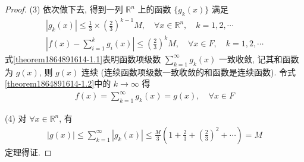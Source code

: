 \documentclass[../../main.tex]{subfiles}
\begin{document}
\begin{proof}
(3) 依次做下去, 得到一列 $\mathbb{R}^n$ 上的函数 $\{g_k(x)\}$ 满足
\begin{gather}
|g_k(x)| \leqslant \frac{1}{3} \times \left(\frac{2}{3}\right)^{k - 1} M, \quad \forall x \in \mathbb{R}^n, \quad k = 1, 2, \cdots
\label{theorem1864891614-1.1}
\\
\left|f(x) - \sum_{i = 1}^{k} g_i(x)\right| \leqslant \left(\frac{2}{3}\right)^k M, \quad \forall x \in F, \quad k = 1, 2, \cdots
\label{theorem1864891614-1.2}
\end{gather}
式\eqref{theorem1864891614-1.1}表明函数项级数 $\sum_{k = 1}^{\infty} g_k(x)$ 一致收敛, 记其和函数为 $g(x)$, 则 $g(x)$ 连续 (连续函数项级数一致收敛的和函数是连续函数). 令式 \eqref{theorem1864891614-1.2}中的 $k \to \infty$ 得
\begin{align*}
f(x) = \sum_{k = 1}^{\infty} g_k(x) = g(x), \quad \forall x \in F
\end{align*}

(4) 对 $\forall x \in \mathbb{R}^n$, 有
\begin{align*}
|g(x)| \leqslant \sum_{k = 1}^{\infty}|g_k(x)| \leqslant \frac{M}{3}\left(1 + \frac{2}{3} + \left(\frac{2}{3}\right)^2 + \cdots\right) = M
\end{align*}
定理得证.
\end{proof}
\end{document}
